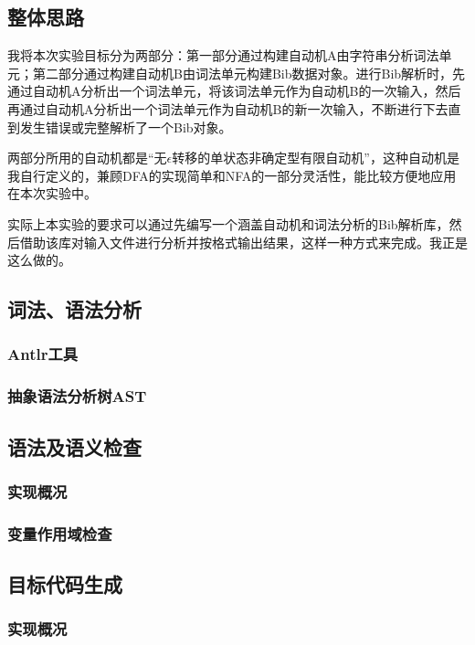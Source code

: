 \documentclass[a4paper]{article}
\begin{document}
\begin{CJK*}{UTF8}{gbsn}
    \subsection{整体思路}
    我将本次实验目标分为两部分：第一部分通过构建自动机A由字符串分析词法单元；第二部分通过构建自动机B由词法单元构建Bib数据对象。进行Bib解析时，先通过自动机A分析出一个词法单元，将该词法单元作为自动机B的一次输入，然后再通过自动机A分析出一个词法单元作为自动机B的新一次输入，不断进行下去直到发生错误或完整解析了一个Bib对象。
    \par 两部分所用的自动机都是“无$\epsilon$转移的单状态非确定型有限自动机”，这种自动机是我自行定义的，兼顾DFA的实现简单和NFA的一部分灵活性，能比较方便地应用在本次实验中。
    \par 实际上本实验的要求可以通过先编写一个涵盖自动机和词法分析的Bib解析库，然后借助该库对输入文件进行分析并按格式输出结果，这样一种方式来完成。我正是这么做的。

    \subsection{词法、语法分析}

    \subsubsection{Antlr工具}

    \subsubsection{抽象语法分析树AST}

    \subsection{语法及语义检查}
    \subsubsection{实现概况}

    \subsubsection{变量作用域检查}

    \subsection{目标代码生成}
    \subsubsection{实现概况}


\end{CJK*}
\end{document}
